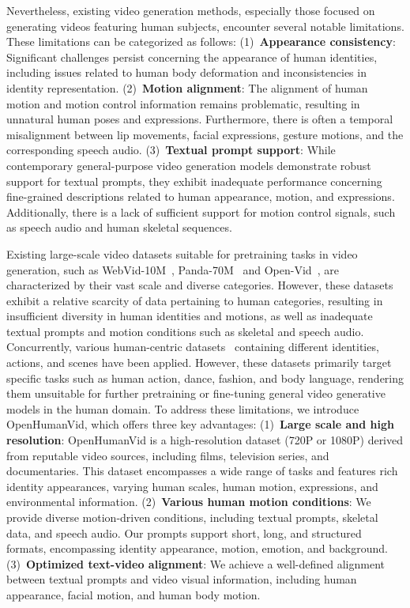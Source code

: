 Nevertheless, existing video generation methods, especially those focused on generating videos featuring human subjects, encounter several notable limitations. 
These limitations can be categorized as follows:
(1)~\textbf{Appearance consistency}: Significant challenges persist concerning the appearance of human identities, including issues related to human body deformation and inconsistencies in identity representation.
(2)~\textbf{Motion alignment}: The alignment of human motion and motion control information remains problematic, resulting in unnatural human poses and expressions. 
Furthermore, there is often a temporal misalignment between lip movements, facial expressions, gesture motions, and the corresponding speech audio.
(3)~\textbf{Textual prompt support}: 
While contemporary general-purpose video generation models demonstrate robust support for textual prompts, they exhibit inadequate performance concerning fine-grained descriptions related to human appearance, motion, and expressions. 
Additionally, there is a lack of sufficient support for motion control signals, such as speech audio and human skeletal sequences.

Existing large-scale video datasets suitable for pretraining tasks in video generation, such as WebVid-10M~\cite{bain2021frozen}, Panda-70M~\cite{chen2024panda} and Open-Vid~\cite{nan2024openvid}, are characterized by their vast scale and diverse categories. 
However, these datasets exhibit a relative scarcity of data pertaining to human categories, resulting in insufficient diversity in human identities and motions, as well as inadequate textual prompts and motion conditions such as skeletal and speech audio. 
Concurrently, various human-centric datasets~\cite{soomro2012ucf101,shahroudy2016ntu,sadoughi2015msp,caba2015activitynet,chang2023magicdance,wang2024disco,jiang2023text2performer,ju2023human,camgoz2018neural} containing different identities, actions, and scenes have been applied. 
However, these datasets primarily target specific tasks such as human action, dance, fashion, and body language, rendering them unsuitable for further pretraining or fine-tuning general video generative models in the human domain.
To address these limitations, we introduce OpenHumanVid, which offers three key advantages:
(1)~\textbf{Large scale and high resolution}: OpenHumanVid is a high-resolution dataset (720P or 1080P) derived from reputable video sources, including films, television series, and documentaries.
This dataset encompasses a wide range of tasks and features rich identity appearances, varying human scales, human motion, expressions, and environmental information.
(2)~\textbf{Various human motion conditions}: We provide diverse motion-driven conditions, including textual prompts, skeletal data, and speech audio. Our prompts support short, long, and structured formats, encompassing identity appearance, motion, emotion, and background.
(3)~\textbf{Optimized text-video alignment}: We achieve a well-defined alignment between textual prompts and video visual information, including human appearance, facial motion, and human body motion.


